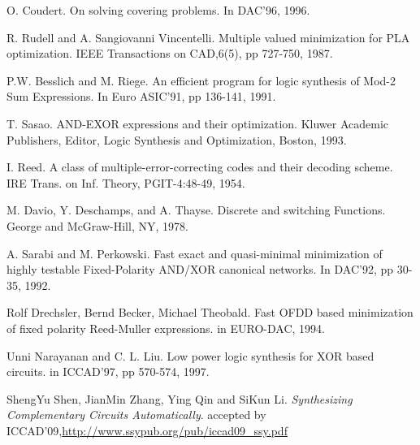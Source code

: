 \documentclass[journal]{IEEEtran}
\begin{document}
\begin{thebibliography}{1}
O. Coudert.
On solving covering problems.
In DAC'96,
1996.

R. Rudell and A. Sangiovanni Vincentelli.
Multiple valued minimization for PLA optimization.
IEEE Transactions on CAD,6(5),
pp 727-750,
1987.

P.W. Besslich and M. Riege.
An efficient program for logic synthesis of Mod-2 Sum Expressions.
In Euro ASIC'91,
pp 136-141,
1991.

T. Sasao.
AND-EXOR expressions and their optimization.
Kluwer Academic Publishers,
Editor,
Logic Synthesis and Optimization,
Boston,
1993.

I. Reed.
A class of multiple-error-correcting codes and their decoding scheme.
IRE Trans. on Inf. Theory, PGIT-4:48-49,
1954.

M. Davio, Y. Deschamps, and A. Thayse.
Discrete and switching Functions.
George and McGraw-Hill, NY,
1978.

A. Sarabi and M. Perkowski.
Fast exact and quasi-minimal minimization of highly testable Fixed-Polarity AND/XOR canonical networks.
In DAC'92,
pp 30-35,
1992.

Rolf Drechsler, Bernd Becker, Michael Theobald.
Fast OFDD based minimization of fixed polarity Reed-Muller expressions.
in EURO-DAC,
1994.

Unni Narayanan and C. L. Liu.
Low power logic synthesis for XOR based circuits.
in ICCAD'97,
pp 570-574,
1997.

ShengYu Shen, JianMin Zhang, Ying Qin and SiKun Li.
\emph{Synthesizing Complementary Circuits Automatically}.
accepted by ICCAD'09,\url{http://www.ssypub.org/pub/iccad09_ssy.pdf}

\end{thebibliography}

%
\end{document}
